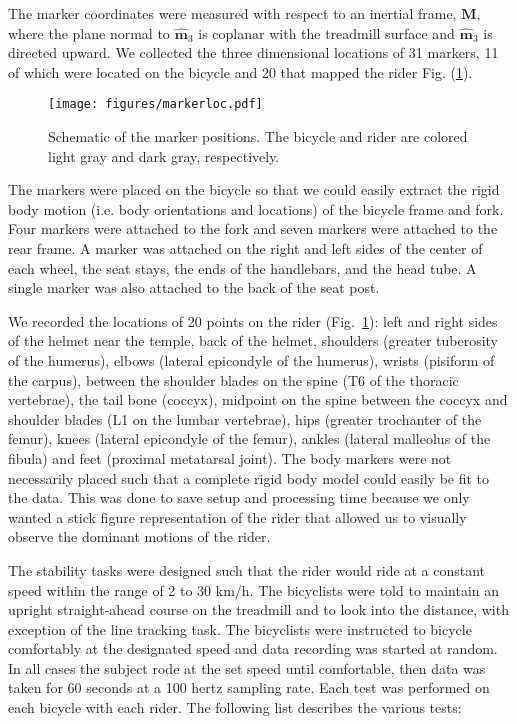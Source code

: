 The marker coordinates were measured with respect to an inertial frame,
$\mathbf{M}$, where the plane normal to $\hat{\mathbf{m}}_3$ is coplanar with
the treadmill surface and $\hat{\mathbf{m}}_3$ is directed upward. We collected
the three dimensional locations of 31 markers, 11 of which were located on the
bicycle and 20 that mapped the rider Fig. (\ref{fig:markerloc}).
\begin{figure}
    \centering
        \texttt{[image: figures/markerloc.pdf]}
    \caption{Schematic of the marker positions. The bicycle and rider are colored light gray and dark gray, respectively.}
    \label{fig:markerloc}
\end{figure}

The markers were placed on the bicycle so that we could easily extract the
rigid body motion (i.e. body orientations and locations) of the bicycle frame
and fork. Four markers were attached to the fork and seven markers were
attached to the rear frame. A marker was attached on the right and left sides
of the center of each wheel, the seat stays, the ends of the handlebars, and
the head tube. A single marker was also attached to the back of the seat post.

We recorded the locations of 20 points
on the rider (Fig.~\ref{fig:markerloc}): left and right sides of
the helmet near the temple, back of the helmet, shoulders (greater tuberosity
of the humerus), elbows (lateral epicondyle of the humerus), wrists (pisiform
of the carpus), between the
shoulder blades on the spine (T6 of the thoracic vertebrae), the tail bone
(coccyx), midpoint on the spine between the coccyx and shoulder blades (L1 on
the lumbar vertebrae), hips (greater trochanter of the femur), knees (lateral
epicondyle of the femur), ankles (lateral malleolus of the fibula) and feet
(proximal metatarsal joint). The body markers were not necessarily placed such
that a complete rigid body model could easily be fit to the data. This was done
to save setup and processing time because we only wanted a stick figure
representation of the rider that allowed us to visually observe the dominant
motions of the rider.

The stability tasks were designed such that the rider would ride at a constant speed
within the range of 2 to 30 km/h. The bicyclists were told to maintain an
upright straight-ahead course on the treadmill and to look into the distance,
with exception of the line tracking task. The bicyclists were instructed to
bicycle comfortably at the designated speed and data recording was started
at random. In all cases the subject rode at the set speed until comfortable,
then data was taken for 60 seconds at a 100 hertz sampling rate. Each test was
performed on each bicycle with each rider. The following list describes the various
tests:

